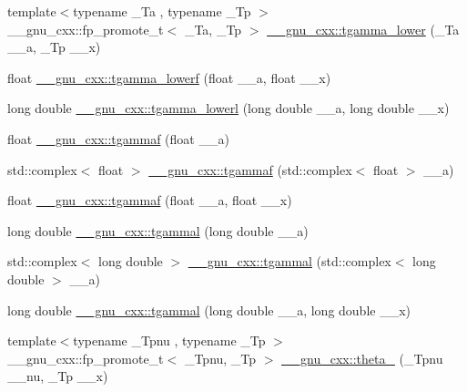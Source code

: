 \begin{DoxyCompactItemize}
\item 
{\footnotesize template$<$typename \+\_\+\+Ta , typename \+\_\+\+Tp $>$ }\\\+\_\+\+\_\+gnu\+\_\+cxx\+::fp\+\_\+promote\+\_\+t$<$ \+\_\+\+Ta, \+\_\+\+Tp $>$ \hyperlink{group__gnu__math__spec__func_gaed107908dec8865ea48e7764f7ea88a2}{\+\_\+\+\_\+gnu\+\_\+cxx\+::tgamma\+\_\+lower} (\+\_\+\+Ta \+\_\+\+\_\+a, \+\_\+\+Tp \+\_\+\+\_\+x)
\item 
float \hyperlink{group__gnu__math__spec__func_ga8f2aabeaa29d21b19c43972efb26798c}{\+\_\+\+\_\+gnu\+\_\+cxx\+::tgamma\+\_\+lowerf} (float \+\_\+\+\_\+a, float \+\_\+\+\_\+x)
\item 
long double \hyperlink{group__gnu__math__spec__func_gad057fe49a5bf95b1550f5f0a6e60bb19}{\+\_\+\+\_\+gnu\+\_\+cxx\+::tgamma\+\_\+lowerl} (long double \+\_\+\+\_\+a, long double \+\_\+\+\_\+x)
\item 
float \hyperlink{group__gnu__math__spec__func_ga008b1f4cc3a54c9c8221ad1f3504b593}{\+\_\+\+\_\+gnu\+\_\+cxx\+::tgammaf} (float \+\_\+\+\_\+a)
\item 
std\+::complex$<$ float $>$ \hyperlink{group__gnu__math__spec__func_gaf548b80db1501cbc067de1564e721972}{\+\_\+\+\_\+gnu\+\_\+cxx\+::tgammaf} (std\+::complex$<$ float $>$ \+\_\+\+\_\+a)
\item 
float \hyperlink{group__gnu__math__spec__func_ga942773871e9c21a50cf13ec160e7e8d9}{\+\_\+\+\_\+gnu\+\_\+cxx\+::tgammaf} (float \+\_\+\+\_\+a, float \+\_\+\+\_\+x)
\item 
long double \hyperlink{group__gnu__math__spec__func_ga2c7d954852d84665aabd43566d67e344}{\+\_\+\+\_\+gnu\+\_\+cxx\+::tgammal} (long double \+\_\+\+\_\+a)
\item 
std\+::complex$<$ long double $>$ \hyperlink{group__gnu__math__spec__func_ga8d53515dba9c860fd6058a4b75aaff58}{\+\_\+\+\_\+gnu\+\_\+cxx\+::tgammal} (std\+::complex$<$ long double $>$ \+\_\+\+\_\+a)
\item 
long double \hyperlink{group__gnu__math__spec__func_gabebff9ffba6acf55f3a3cd716ef5007a}{\+\_\+\+\_\+gnu\+\_\+cxx\+::tgammal} (long double \+\_\+\+\_\+a, long double \+\_\+\+\_\+x)
\item 
{\footnotesize template$<$typename \+\_\+\+Tpnu , typename \+\_\+\+Tp $>$ }\\\+\_\+\+\_\+gnu\+\_\+cxx\+::fp\+\_\+promote\+\_\+t$<$ \+\_\+\+Tpnu, \+\_\+\+Tp $>$ \hyperlink{group__gnu__math__spec__func_gaa2e5a3a5f550fe032a596a8b01c878c0}{\+\_\+\+\_\+gnu\+\_\+cxx\+::theta\+\_} (\+\_\+\+Tpnu \+\_\+\+\_\+nu, \+\_\+\+Tp \+\_\+\+\_\+x)
\item 

\end{DoxyCompactItemize}
